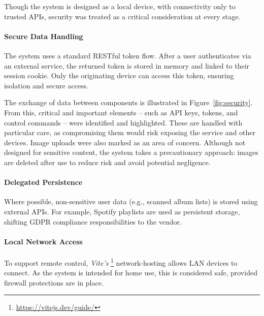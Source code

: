             Though the system is designed as a local device, with connectivity only to trusted APIs, security was treated as a critical consideration at every stage.
    
            \paragraph{Secure Data Handling} The system uses a standard RESTful token flow. After a user authenticates via an external service, the returned token is stored in memory and linked to their session cookie. Only the originating device can access this token, ensuring isolation and secure access.
    
            The exchange of data between components is illustrated in Figure~\ref{fig:security}. From this, critical and important elements -- such as API keys, tokens, and control commands -- were identified and highlighted. These are handled with particular care, as compromising them would risk exposing the service and other devices. Image uploads were also marked as an area of concern. Although not designed for sensitive content, the system takes a precautionary approach: images are deleted after use to reduce risk and avoid potential negligence.
    
            \paragraph{Delegated Persistence} Where possible, non-sensitive user data (e.g., scanned album lists) is stored using external APIs. For example, Spotify playlists are used as persistent storage, shifting GDPR compliance responsibilities to the vendor.
    
            \paragraph{Local Network Access} To support remote control, \textit{Vite's} \footnote{\url{https://vitejs.dev/guide/}} network-hosting allows LAN devices to connect. As the system is intended for home use, this is considered safe, provided firewall protections are in place.
    
